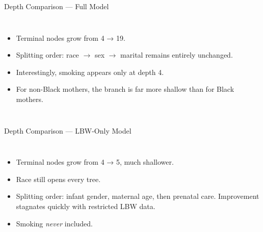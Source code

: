 \documentclass[aspectratio=169,professionalfonts]{beamer}
\begin{document}
\begin{frame}{Depth Comparison — Full Model}
\scriptsize
\begin{columns}[T]

\centering
{}   %

\begin{itemize}\itemsep2pt
  \item Terminal nodes grow from 4 → 19.
  \item Splitting order: race $\to$ sex $\to$ marital remains entirely unchanged.
  \item Interestingly, smoking appears only at depth 4. 
  \item For non-Black mothers, the branch is far more shallow than for Black mothers.
\end{itemize}

\end{columns}
\end{frame}

\begin{frame}{Depth Comparison — LBW-Only Model}
\scriptsize
\begin{columns}[T]

\centering
{}   %

\begin{itemize}\itemsep2pt
    \item Terminal nodes grow from 4 → 5, much shallower.  
    \item Race still opens every tree.
    \item Splitting order: infant gender, maternal age, then prenatal care. Improvement stagnates quickly with restricted LBW data.
  \item Smoking \emph{never} included. 
\end{itemize}

\end{columns}
\end{frame}


\end{document}
